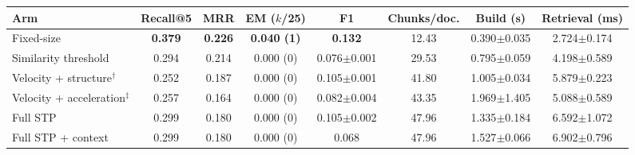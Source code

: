\begin{tabular*}{\textwidth}{@{\extracolsep{\fill}}lccccccc@{}}
\toprule
Arm & Recall@5 & MRR & EM ($k$/25) & F1 & Chunks/doc. & Build (s) & Retrieval (ms) \\
\midrule
Fixed-size & \textbf{0.379} & \textbf{0.226} & \textbf{0.040 (1)} & \textbf{0.132} & 12.43 & 0.390{\scriptsize$\pm$0.035} & 2.724{\scriptsize$\pm$0.174} \\
Similarity threshold & 0.294 & 0.214 & 0.000 (0) & 0.076{\scriptsize$\pm$0.001} & 29.53 & 0.795{\scriptsize$\pm$0.059} & 4.198{\scriptsize$\pm$0.589} \\
Velocity + structure$^{\dagger}$ & 0.252 & 0.187 & 0.000 (0) & 0.105{\scriptsize$\pm$0.001} & 41.80 & 1.005{\scriptsize$\pm$0.034} & 5.879{\scriptsize$\pm$0.223} \\
Velocity + acceleration$^{\ddagger}$ & 0.257 & 0.164 & 0.000 (0) & 0.082{\scriptsize$\pm$0.004} & 43.35 & 1.969{\scriptsize$\pm$1.405} & 5.088{\scriptsize$\pm$0.589} \\
Full STP & 0.299 & 0.180 & 0.000 (0) & 0.105{\scriptsize$\pm$0.002} & 47.96 & 1.335{\scriptsize$\pm$0.184} & 6.592{\scriptsize$\pm$1.072} \\
Full STP + context & 0.299 & 0.180 & 0.000 (0) & 0.068 & 47.96 & 1.527{\scriptsize$\pm$0.066} & 6.902{\scriptsize$\pm$0.796} \\
\bottomrule
\end{tabular*}
